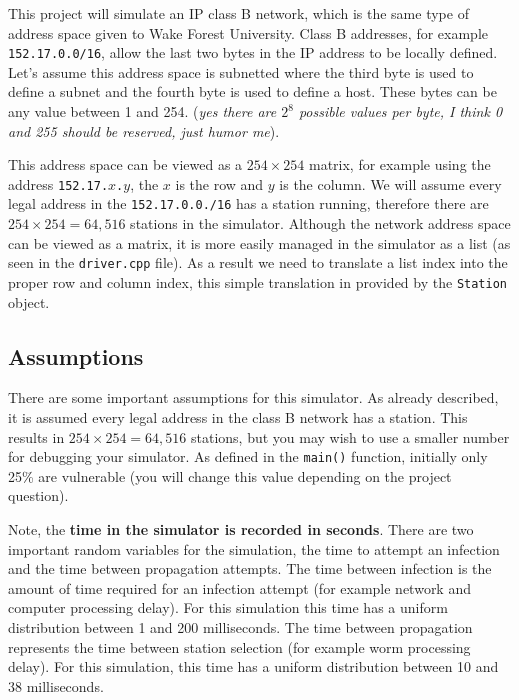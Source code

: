 \documentclass[10pt]{article}
\begin{document}
This project will simulate an IP class B network, which is the
same type of address space given to Wake Forest University. Class
B addresses, for example \texttt{152.17.0.0/16}, allow the last
two bytes in the IP address to be locally defined. Let's assume
this address space is subnetted where the third byte is used to
define a subnet and the fourth byte is used to define a host.
These bytes can be any value between 1 and 254. (\textit{yes there
are $2^{8}$ possible values per byte, I think 0 and 255 should be
reserved, just humor me}).

This address space can be viewed as a $254 \times 254$ matrix, for
example using the address \texttt{152.17.$x$.$y$}, the $x$ is the
row and $y$ is the column. We will assume every legal address in
the \texttt{152.17.0.0./16} has a station running, therefore there
are $254 \times 254 = 64,516$ stations in the simulator. Although
the network address space can be viewed as a matrix, it is more
easily managed in the simulator as a list (as seen in the
\texttt{driver.cpp} file). As a result we need to translate a
list index into the proper row and column index, this simple
translation in provided by the \texttt{Station} object.

\subsection*{Assumptions}

There are some important assumptions for this simulator. As
already described, it is assumed every legal address in the class
B network has a station. This results in $254 \times 254 = 64,516$
stations, but you may wish to use a smaller number for debugging
your simulator. As defined in the \texttt{main()} function,
initially only 25\% are vulnerable (you will change this value
depending on the project question).

Note, the \textbf{time in the simulator is recorded in seconds}.
There are two important random variables for the simulation, the
time to attempt an infection and the time between propagation
attempts. The time between infection is the amount of time
required for an infection attempt (for example network and
computer processing delay). For this simulation this time has a
uniform distribution between 1 and 200 milliseconds. The time
between propagation represents the time between station selection
(for example worm processing delay). For this simulation, this
time has a uniform distribution between 10 and 38 milliseconds.
\end{document}
